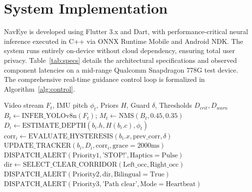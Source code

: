 \documentclass[conference]{IEEEtran}
\begin{document}
\section{System Implementation}
NavEye is developed using Flutter 3.x and Dart, with performance-critical neural inference executed in C++ via ONNX Runtime Mobile and Android NDK. The system runs entirely on-device without cloud dependency, ensuring total user privacy. Table~\ref{tab:specs} details the architectural specifications and observed component latencies on a mid-range Qualcomm Snapdragon 778G test device. The comprehensive real-time guidance control loop is formalized in Algorithm~\ref{alg:control}.

\begin{algorithm}[t]
\caption{NavEye Real-Time Multi-Modal Perception Loop}
\label{alg:control}
\begin{algorithmic}[1]
\REQUIRE Video stream $F_t$, IMU pitch $\phi_t$, Priors $H$, Guard $\delta$, Thresholds $D_{crit}, D_{warn}$
    \STATE $B_t \leftarrow \text{INFER\_YOLOv8n}(F_t)$; $M_t \leftarrow \text{NMS}(B_t, 0.45, 0.35)$
        \STATE $D_i \leftarrow \text{ESTIMATE\_DEPTH}(b_i.h, H(b_i.c), \phi_t)$ 
        \STATE $\text{corr}_i \leftarrow \text{EVALUATE\_HYSTERESIS}(b_i.x, \text{prev\_corr}, \delta)$ 
        \STATE $\text{UPDATE\_TRACKER}(b_i, D_i, \text{corr}_i, \text{grace}=2000\text{ms})$
    \ENDFOR
        \STATE $\text{DISPATCH\_ALERT}(\text{Priority1}, \text{'STOP!'}, \text{Haptics}=\text{Pulse})$
        \STATE $\text{dir} \leftarrow \text{SELECT\_CLEAR\_CORRIDOR}(\text{Left\_occ}, \text{Right\_occ})$
        \STATE $\text{DISPATCH\_ALERT}(\text{Priority2}, \text{dir}, \text{Bilingual}=\text{True})$
        \STATE $\text{DISPATCH\_ALERT}(\text{Priority3}, \text{'Path clear'}, \text{Mode}=\text{Heartbeat})$
    \ENDIF
\ENDFOR
\end{algorithmic}
\end{algorithm}
\end{document}
